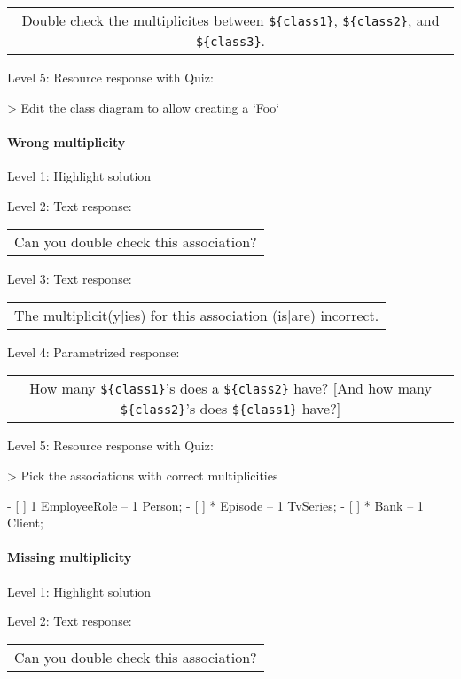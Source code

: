 \begin{tabular}{|c}
Double check the multiplicites between \verb|${class1}|, \verb|${class2}|, and \verb|${class3}|.
\end{tabular} \medskip

\noindent Level 5: Resource response with Quiz:

> Edit the class diagram to allow creating a `Foo`


\paragraph{Wrong multiplicity}

\noindent Level 1: Highlight solution \medskip

\noindent Level 2: Text response: \medskip

\begin{tabular}{|c}
Can you double check this association?
\end{tabular} \medskip

\noindent Level 3: Text response: \medskip

\begin{tabular}{|c}
The multiplicit(y|ies) for this association (is|are) incorrect.
\end{tabular} \medskip

\noindent Level 4: Parametrized response: \medskip

\begin{tabular}{|c}
How many \verb|${class1}|'s does a \verb|${class2}| have? [And how many \verb|${class2}|'s does \verb|${class1}| have?]
\end{tabular} \medskip

\noindent Level 5: Resource response with Quiz:

> Pick the associations with correct multiplicities

- [ ] 1 EmployeeRole -- 1 Person;
- [ ] * Episode -- 1 TvSeries;
- [ ] * Bank -- 1 Client;


\paragraph{Missing multiplicity}

\noindent Level 1: Highlight solution \medskip

\noindent Level 2: Text response: \medskip

\begin{tabular}{|c}
Can you double check this association?
\end{tabular} \medskip

